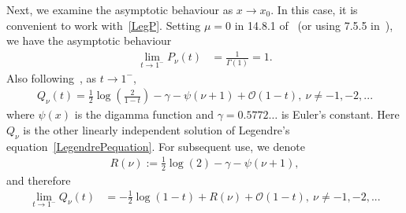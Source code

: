 \documentclass[final]{siamltex}
\newcommand{\bigO} {\mathcal{O}}
\begin{document}
Next, we examine the asymptotic behaviour as $x\rightarrow x_0$. In this
case, it is convenient to work with~\eqref{LegP}. Setting $\mu=0$ in
14.8.1 of~\cite{fatAbramowitz} (or using 7.5.5 in~\cite{lebedev}), we have the asymptotic behaviour
\begin{align} 
  \label{Pasymptotics}
  \lim_{t\rightarrow 1^- } P_\nu(t)&= \frac{1}{\Gamma(1)}=1.
\end{align}
Also following~\cite{fatAbramowitz}, as $t\rightarrow 1^{-}$,
\begin{align*}
  Q_{\nu}(t)=\frac{1}{2}\log\left(\frac{2}{1-t}\right)-\gamma
  -\psi(\nu+1)+\bigO(1-t),\: \nu \neq -1,-2,...
\end{align*} 
where $\psi(x)$ is the digamma function and $\gamma=0.5772\ldots$ is
Euler's constant.  Here $Q_\nu$ is the other linearly independent
solution of Legendre's equation~\eqref{LegendrePequation}.  For subsequent use, we denote 
\begin{align*}
  R(\nu):= \frac{1}{2}\log(2) -\gamma -\psi(\nu+1), 
\end{align*}
and therefore
\begin{align}
  \label{Qasymptotics}
  \lim_{t\rightarrow 1^-}Q_{\nu}(t)&=-\frac{1}{2}\log(1-t) + 
  R(\nu) + \bigO(1-t),\: \nu \neq -1,-2,... 
\end{align}

\end{document}
